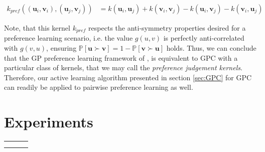 \documentclass{article}
\newcommand{\upref}{\bm{u}}
\newcommand{\vpref}{\bm{v}}
\newcommand{\ourmethod}{BALD } %
\begin{document}
\begin{align}
	k_{pref}((\upref_i,\vpref_i),(\upref_j,\vpref_j)) &= k(\upref_i,\upref_j) + k(\vpref_i,\vpref_j) - k(\upref_i,\vpref_j) - k(\vpref_i,\upref_j)
\end{align}

Note, that this kernel $k_{pref}$ respects the anti-symmetry properties desired for a preference learning scenario, i.e. the value $g(u,v)$ is perfectly anti-correlated with $g(v,u)$, ensuring $\mathbb{P}[\upref\succ \vpref] = 1 - \mathbb{P}[\vpref \succ \upref]$ holds. Thus, we can conclude that the GP preference learning framework of \cite{chu2005}, is equivalent to GPC with a particular class of kernels, that we may call the \emph{preference judgement kernels}. Therefore, our active learning algorithm presented in section \ref{sec:GPC} for GPC can readily be applied to pairwise preference learning as well.

\section{Experiments}

\begin{figure*}[t]
\begin{center}
\begin{tabular}{ccc}
&
&
\\
&
&
 \\
\end{tabular}
\end{center}
\caption{\emph{Top:} Artificial datasets used in our evaluation of active learning methods. Exemplars of the two classes are shown with black squares (\ref{plots:positives}) and red circles (\ref{plots:negatives}). \emph{Bottom:} Results of active learning with nine methods: random query (\ref{plots:rand}), \ourmethod (\ref{plots:BALD}),  MES (\ref{plots:maxent}), QBC with the vote criterion with 2 ($\mbox{QBC}_2$, \ref{plots:QBC2}) and 100 ($\mbox{QBC}_{100}$, \ref{plots:QBC100}) committee members, active SVM (\ref{plots:SVM}), IVM (\ref{plots:IVM}), Kapoor \emph{et al.} \cite{kapoor2007} (\ref{plots:dec}), Zhu \emph{et al.} \cite{zhu2003} (\ref{plots:semi}) and empirical error (\ref{plots:emp}).}
\label{fig:artificial}
\end{figure*}
\end{document}
